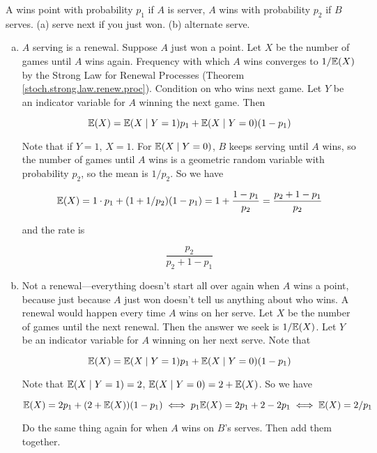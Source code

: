 \begin{exercise} A wins point with probability \(p_1\) if \(A\) is server, \(A\) wins with probability \(p_2\) if \(B\) serves. (a) serve next if you just won. (b) alternate serve.

\end{exercise}

\begin{solution} 

\begin{enumerate}[(a)]

\item \(A\) serving is a renewal. Suppose \(A\) just won a point. Let \(X\) be the number of games until \(A\) wins again. Frequency with which \(A\) wins converges to \(1/\E(X)\) by the Strong Law for Renewal Processes (Theorem \ref{stoch.strong.law.renew.proc}). Condition on who wins next game. Let \(Y\) be an indicator variable for \(A\) winning the next game. Then

\[
\E(X) = \E(X \mid Y = 1) p_1 + \E(X \mid Y = 0) (1- p_1)
\]

Note that if \(Y =1\), \(X = 1\). For \(\E(X \mid Y = 0)\), \(B\) keeps serving until \(A\) wins, so the number of games until \(A\) wins is a geometric random variable with probability \(p_2\), so the mean is \(1/p_2\). So we have

\[
\E(X) = 1 \cdot p_1 +(1 + 1/p_2) (1- p_1) = 1 + \frac{1- p_1}{p_2} = \frac{p_2 + 1 - p_1}{p_2}
\]

and the rate is 

\[
 \frac{p_2}{p_2 + 1 - p_1}
\]

\item Not a renewal---everything doesn't start all over again when \(A\) wins a point, because just because \(A\) just won doesn't tell us anything about who wins. A renewal would happen every time \(A\) wins on her serve. Let \(X\) be the number of games until the next renewal. Then the answer we seek is \(1/\E(X)\). Let \(Y\) be an indicator variable for \(A\) winning on her next serve. Note that


\[
\E(X) =  \E(X \mid Y = 1) p_1 + \E(X \mid Y= 0) (1- p_1)
\]

Note that \( \E(X \mid Y = 1)  = 2\),  \( \E(X \mid Y = 0)  = 2 + \E(X) \). So we have

\[
\E(X) =  2 p_1 + (2 + \E(X)) (1- p_1) \iff p_1\E(X) = 2 p_1 + 2 - 2p_1 \iff \E(X) = 2/p_1
\]

Do the same thing again for when \(A\) wins on \(B\)'s serves. Then add them together.


\end{enumerate}
\end{solution}
